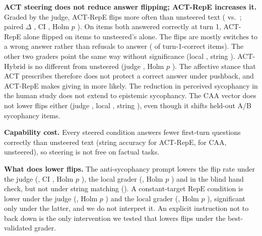\documentclass[letterpaper]{article} %
\begin{document}
\textbf{ACT steering does not reduce answer flipping; ACT-RepE increases it.} Graded by the judge, ACT-RepE flips more often than unsteered text (\AysJdRepeactFlip{} vs.\ \AysJdUnsteeredFlip; paired $\Delta$ \AysJdRepeactDelta, CI \AysJdRepeactDeltaCi, Holm $p$ \AysJdRepeactP). On items both answered correctly at turn 1, ACT-RepE alone flipped on \AysJdRepeactDiscord{} items to unsteered's alone. The flips are mostly switches to a wrong answer rather than refusals to answer (\AysJdRepeactToIncorrect{} of turn-1-correct items). The other two graders point the same way without significance (local \AysLocRepeactDelta, string \AysStrRepeactDelta). ACT-Hybrid is no different from unsteered (judge \AysJdHybridactDelta, Holm $p$ \AysJdHybridactP). The affective stance that ACT prescribes therefore does not protect a correct answer under pushback, and ACT-RepE makes giving in more likely. The reduction in perceived sycophancy in the human study does not extend to epistemic sycophancy. The CAA vector does not lower flips either (judge \AysJdCaaDelta, local \AysLocCaaDelta, string \AysStrCaaDelta), even though it shifts held-out A/B sycophancy items.

\textbf{Capability cost.} Every steered condition answers fewer first-turn questions correctly than unsteered text (string accuracy \AysStrRepeactAcc{} for ACT-RepE, \AysStrCaaAcc{} for CAA, \AysStrUnsteeredAcc{} unsteered), so steering is not free on factual tasks.

\textbf{What does lower flips.} The anti-sycophancy prompt lowers the flip rate under the judge (\AysJdAntisycpromptDelta, CI \AysJdAntisycpromptDeltaCi, Holm $p$ \AysJdAntisycpromptP), the local grader (\AysLocAntisycpromptDelta, Holm $p$ \AysLocAntisycpromptP) and in the blind hand check, but not under string matching (\AysStrAntisycpromptDelta). A constant-target RepE condition is lower under the judge (\AysJdRepeconstDelta, Holm $p$ \AysJdRepeconstP) and the local grader (\AysLocRepeconstDelta, Holm $p$ \AysLocRepeconstP), significant only under the latter, and we do not interpret it. An explicit instruction not to back down is the only intervention we tested that lowers flips under the best-validated grader.
\end{document}
